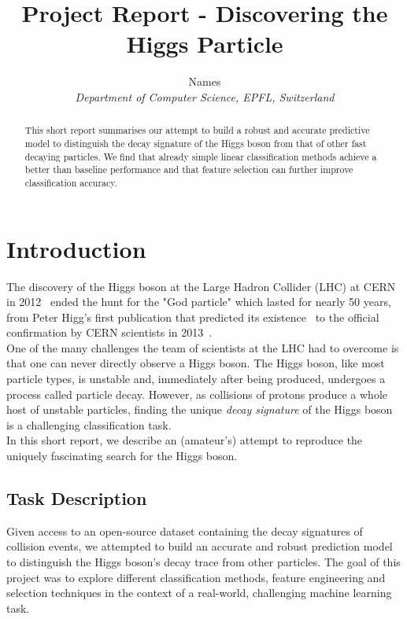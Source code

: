 \documentclass[10pt,conference,compsocconf]{IEEEtran}
\begin{document}
\title{Project Report - Discovering the Higgs Particle}

\author{
  Names\\
  \textit{Department of Computer Science, EPFL, Switzerland}
}

\maketitle

\begin{abstract}
This short report summarises our attempt to build a robust and accurate predictive model to distinguish the decay signature of the Higgs boson from that of other fast decaying particles. We find that already simple linear classification methods achieve a better than baseline performance and that feature selection can further improve classification accuracy.
\end{abstract}


\section{Introduction}

The discovery of the Higgs boson at the Large Hadron Collider (LHC) at CERN in 2012~\cite{Aad2012} ended the hunt for the "God particle" which lasted for nearly 50 years, from Peter Higg's first publication that predicted its existence~\cite{Higgs1964} to the official confirmation by CERN scientists in 2013~\cite{CERN}.\\
One of the many challenges the team of scientists at the LHC had to overcome is that one can never directly observe a Higgs boson. The Higgs boson, like most particle types, is unstable and, immediately after being produced, undergoes a process called particle decay. However, as collisions of protons produce a whole host of unstable particles, finding the unique \emph{decay signature} of the Higgs boson is a challenging classification task.\\
In this short report, we describe an (amateur's) attempt to reproduce the uniquely fascinating search for the Higgs boson.

\subsection{Task Description}
Given access to an open-source dataset containing the decay signatures of collision events, we attempted to build an accurate and robust prediction model to distinguish the Higgs boson's decay trace from other particles. The goal of this project was to explore different classification methods, feature engineering and selection techniques in the context of a real-world, challenging machine learning task. 
\end{document}
